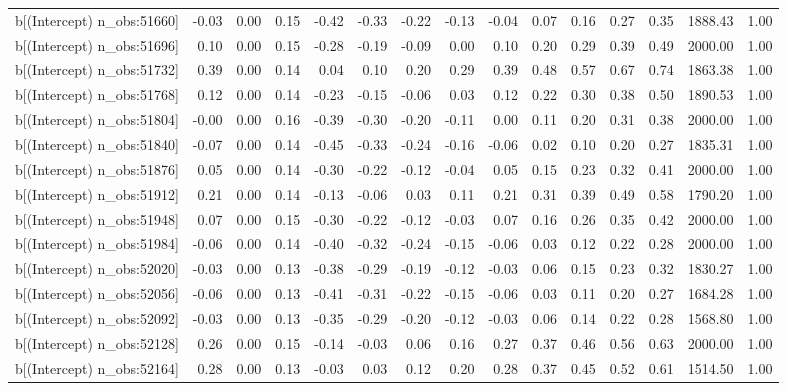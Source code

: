 \begin{table}[ht]
\begin{tabular}{rrrrrrrrrrrrrrr}
  b[(Intercept) n\_obs:51660] & -0.03 & 0.00 & 0.15 & -0.42 & -0.33 & -0.22 & -0.13 & -0.04 & 0.07 & 0.16 & 0.27 & 0.35 & 1888.43 & 1.00 \\ 
  b[(Intercept) n\_obs:51696] & 0.10 & 0.00 & 0.15 & -0.28 & -0.19 & -0.09 & 0.00 & 0.10 & 0.20 & 0.29 & 0.39 & 0.49 & 2000.00 & 1.00 \\ 
  b[(Intercept) n\_obs:51732] & 0.39 & 0.00 & 0.14 & 0.04 & 0.10 & 0.20 & 0.29 & 0.39 & 0.48 & 0.57 & 0.67 & 0.74 & 1863.38 & 1.00 \\ 
  b[(Intercept) n\_obs:51768] & 0.12 & 0.00 & 0.14 & -0.23 & -0.15 & -0.06 & 0.03 & 0.12 & 0.22 & 0.30 & 0.38 & 0.50 & 1890.53 & 1.00 \\ 
  b[(Intercept) n\_obs:51804] & -0.00 & 0.00 & 0.16 & -0.39 & -0.30 & -0.20 & -0.11 & 0.00 & 0.11 & 0.20 & 0.31 & 0.38 & 2000.00 & 1.00 \\ 
  b[(Intercept) n\_obs:51840] & -0.07 & 0.00 & 0.14 & -0.45 & -0.33 & -0.24 & -0.16 & -0.06 & 0.02 & 0.10 & 0.20 & 0.27 & 1835.31 & 1.00 \\ 
  b[(Intercept) n\_obs:51876] & 0.05 & 0.00 & 0.14 & -0.30 & -0.22 & -0.12 & -0.04 & 0.05 & 0.15 & 0.23 & 0.32 & 0.41 & 2000.00 & 1.00 \\ 
  b[(Intercept) n\_obs:51912] & 0.21 & 0.00 & 0.14 & -0.13 & -0.06 & 0.03 & 0.11 & 0.21 & 0.31 & 0.39 & 0.49 & 0.58 & 1790.20 & 1.00 \\ 
  b[(Intercept) n\_obs:51948] & 0.07 & 0.00 & 0.15 & -0.30 & -0.22 & -0.12 & -0.03 & 0.07 & 0.16 & 0.26 & 0.35 & 0.42 & 2000.00 & 1.00 \\ 
  b[(Intercept) n\_obs:51984] & -0.06 & 0.00 & 0.14 & -0.40 & -0.32 & -0.24 & -0.15 & -0.06 & 0.03 & 0.12 & 0.22 & 0.28 & 2000.00 & 1.00 \\ 
  b[(Intercept) n\_obs:52020] & -0.03 & 0.00 & 0.13 & -0.38 & -0.29 & -0.19 & -0.12 & -0.03 & 0.06 & 0.15 & 0.23 & 0.32 & 1830.27 & 1.00 \\ 
  b[(Intercept) n\_obs:52056] & -0.06 & 0.00 & 0.13 & -0.41 & -0.31 & -0.22 & -0.15 & -0.06 & 0.03 & 0.11 & 0.20 & 0.27 & 1684.28 & 1.00 \\ 
  b[(Intercept) n\_obs:52092] & -0.03 & 0.00 & 0.13 & -0.35 & -0.29 & -0.20 & -0.12 & -0.03 & 0.06 & 0.14 & 0.22 & 0.28 & 1568.80 & 1.00 \\ 
  b[(Intercept) n\_obs:52128] & 0.26 & 0.00 & 0.15 & -0.14 & -0.03 & 0.06 & 0.16 & 0.27 & 0.37 & 0.46 & 0.56 & 0.63 & 2000.00 & 1.00 \\ 
  b[(Intercept) n\_obs:52164] & 0.28 & 0.00 & 0.13 & -0.03 & 0.03 & 0.12 & 0.20 & 0.28 & 0.37 & 0.45 & 0.52 & 0.61 & 1514.50 & 1.00 \\ 

\end{tabular}
\end{table}
